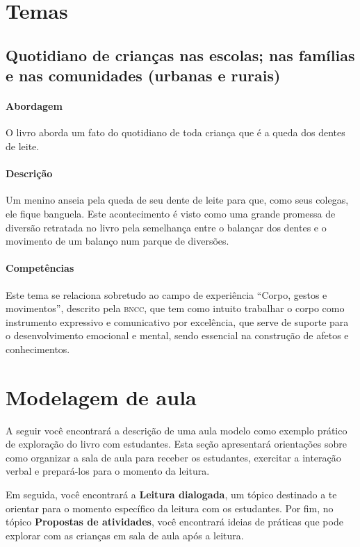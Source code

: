 \documentclass[11pt]{extarticle}
\begin{document}
\section{Temas}

\subsection{Quotidiano de crianças nas escolas; nas famílias e nas comunidades (urbanas e rurais)}

\paragraph{Abordagem} 
O livro aborda um fato do quotidiano de toda criança que é a queda dos dentes de leite.
\paragraph{Descrição} 
Um menino anseia pela queda de seu dente de leite para que, como seus colegas, ele fique banguela.
Este acontecimento é visto como uma grande promessa de diversão retratada no livro 
pela semelhança entre o balançar dos dentes e o movimento de um balanço num
parque de diversões.
\paragraph{Competências} 
Este tema se relaciona sobretudo ao campo de experiência ``Corpo, gestos e movimentos'', descrito pela
\textsc{bncc}, que tem como intuito trabalhar o corpo como instrumento expressivo e comunicativo por excelência, 
que serve de suporte para o desenvolvimento emocional e mental, sendo essencial na construção de afetos e conhecimentos.

\section{Modelagem de aula}
A seguir você encontrará a descrição de uma aula modelo como exemplo 
prático de exploração do livro com estudantes. Esta seção apresentará 
orientações sobre como organizar a sala de aula para receber os 
estudantes, exercitar a interação verbal e prepará-los para o 
momento da leitura.

Em seguida, você encontrará a \textbf{Leitura dialogada}, um 
tópico destinado a te orientar para o momento específico da 
leitura com os estudantes. Por fim, no tópico 
\textbf{Propostas de atividades}, você encontrará ideias 
de práticas que pode explorar com as crianças em sala de 
aula após a leitura. 
\end{document}
